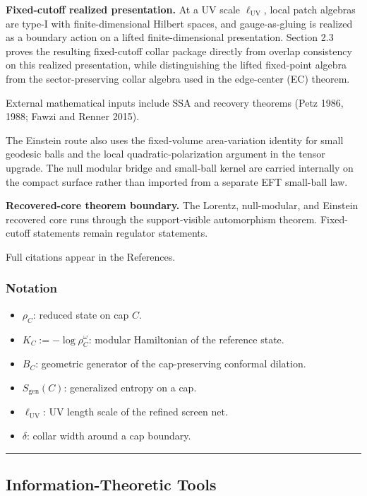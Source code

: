 \textbf{Fixed-cutoff realized presentation.} At a UV scale \(\ell_{\mathrm{UV}}\), local patch algebras are type-I with finite-dimensional Hilbert spaces, and gauge-as-gluing is realized as a boundary action on a lifted finite-dimensional presentation. Section 2.3 proves the resulting fixed-cutoff collar package directly from overlap consistency on this realized presentation, while distinguishing the lifted fixed-point algebra from the sector-preserving collar algebra used in the edge-center (EC) theorem.

External mathematical inputs include SSA and recovery theorems (Petz 1986, 1988; Fawzi and
Renner 2015).

The Einstein route also uses the fixed-volume area-variation identity for small geodesic balls and
the local quadratic-polarization argument in the tensor upgrade. The null modular bridge and
small-ball kernel are carried internally on the compact surface rather than imported from a
separate EFT small-ball law.

\textbf{Recovered-core theorem boundary.} The Lorentz, null-modular, and Einstein recovered core
runs through the support-visible automorphism theorem. Fixed-cutoff statements remain regulator
statements.

Full citations appear in the References.

\subsubsection{Notation}\label{15-notation}

\begin{itemize}
\tightlist
\item
  \(\rho_C\): reduced state on cap \(C\).
\item
  \(K_C := -\log \rho_C^{\omega}\): modular Hamiltonian of the reference state.
\item
  \(B_C\): geometric generator of the cap-preserving conformal dilation.
\item
  \(S_{\mathrm{gen}}(C)\): generalized entropy on a cap.
\item
  \(\ell_{\mathrm{UV}}\): UV length scale of the refined screen net.
\item
  \(\delta\): collar width around a cap boundary.
\end{itemize}

\begin{center}\rule{0.5\linewidth}{0.5pt}\end{center}
\subsection{Information-Theoretic Tools}\label{2-information-theoretic-tools}

